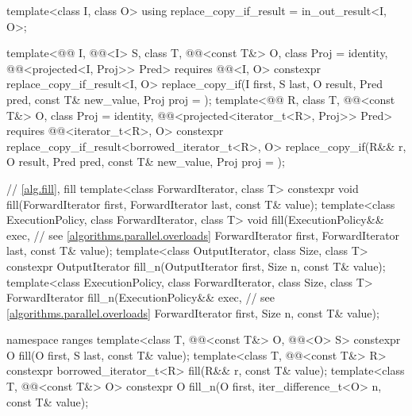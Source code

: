 \begin{codeblock}
{{    template<class I, class O>
      using replace_copy_if_result = in_out_result<I, O>;

    template<@@ I, @@<I> S, class T, @@<const T&> O,
             class Proj = identity, @@<projected<I, Proj>> Pred>
      requires @@<I, O>
      constexpr replace_copy_if_result<I, O>
        replace_copy_if(I first, S last, O result, Pred pred, const T& new_value,
                        Proj proj = {});
    template<@@ R, class T, @@<const T&> O, class Proj = identity,
             @@<projected<iterator_t<R>, Proj>> Pred>
      requires @@<iterator_t<R>, O>
      constexpr replace_copy_if_result<borrowed_iterator_t<R>, O>
        replace_copy_if(R&& r, O result, Pred pred, const T& new_value,
                        Proj proj = {});
  }

  // \ref{alg.fill}, fill
  template<class ForwardIterator, class T>
    constexpr void fill(ForwardIterator first, ForwardIterator last, const T& value);
  template<class ExecutionPolicy, class ForwardIterator, class T>
    void fill(ExecutionPolicy&& exec,                           // see \ref{algorithms.parallel.overloads}
              ForwardIterator first, ForwardIterator last, const T& value);
  template<class OutputIterator, class Size, class T>
    constexpr OutputIterator fill_n(OutputIterator first, Size n, const T& value);
  template<class ExecutionPolicy, class ForwardIterator,
           class Size, class T>
    ForwardIterator fill_n(ExecutionPolicy&& exec,              // see \ref{algorithms.parallel.overloads}
                           ForwardIterator first, Size n, const T& value);

  namespace ranges {
    template<class T, @@<const T&> O, @@<O> S>
      constexpr O fill(O first, S last, const T& value);
    template<class T, @@<const T&> R>
      constexpr borrowed_iterator_t<R> fill(R&& r, const T& value);
    template<class T, @@<const T&> O>
      constexpr O fill_n(O first, iter_difference_t<O> n, const T& value);
  }

}
\end{codeblock}
